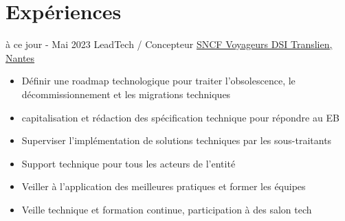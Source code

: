 \documentclass[letterpaper]{twentysecondcv} %
\begin{document}
	
	\makeprofile %
	
	
	\section{Expériences}
	
	\begin{twenty} %
		
		\twentyitem
		{à ce jour -}	
		{Mai 2023}
		{LeadTech / Concepteur}
		{\href{https://www.transilien.com/fr}{SNCF Voyageurs DSI Translien, Nantes}}
		{}
		{
			\begin{itemize}
				\item Définir une roadmap technologique pour traiter l'obsolescence, le décommissionnement et les migrations techniques
				\item capitalisation et rédaction des spécification technique pour répondre au EB
				\item Superviser l'implémentation de solutions techniques par les sous-traitants
				\item Support technique pour tous les acteurs de l'entité
				\item Veiller à l'application des meilleures pratiques et former les équipes 
				\item Veille technique et formation continue, participation à des salon tech                                                            
				
			\end{itemize}
		}
		

\end{twenty}
\end{document}
